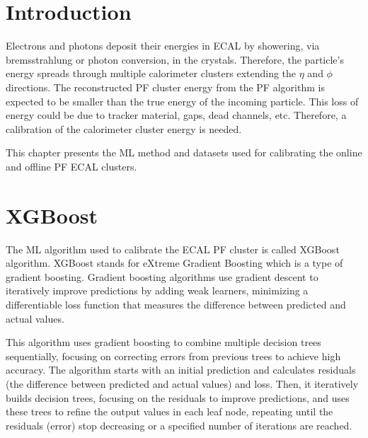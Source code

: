 
\section{Introduction}
Electrons and photons deposit their energies in ECAL by showering, via bremsstrahlung or photon conversion, in the crystals.
Therefore, the particle's energy spreads through multiple calorimeter clusters extending the $\eta$ and $\phi$ directions.
The reconstructed PF cluster energy from the PF algorithm is expected to be smaller than the true energy of the incoming particle.
This loss of energy could be due to tracker material, gaps, dead channels, etc.
Therefore, a calibration of the calorimeter cluster energy is needed.

This chapter presents the ML method and datasets used for calibrating the online and offline PF ECAL clusters.


\section{XGBoost} %

The ML algorithm used to calibrate the ECAL PF cluster is called XGBoost algorithm.
XGBoost stands for eXtreme Gradient Boosting which is a type of gradient boosting.
Gradient boosting algorithms use gradient descent to iteratively improve predictions by adding weak learners, minimizing a differentiable loss function that measures the difference between predicted and actual values.

This algorithm
uses gradient boosting to combine multiple decision trees sequentially, focusing on correcting errors from previous trees to achieve high accuracy.
The algorithm starts with an initial prediction and calculates residuals (the difference between predicted and actual values) and loss.
Then, it iteratively builds decision trees, focusing on the residuals to improve predictions, and uses these trees to refine the output values in each leaf node, repeating until the residuals (error) stop decreasing or a specified number of iterations are reached.

